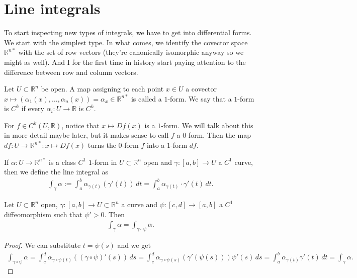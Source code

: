 \section{Line integrals}

To start inspecting new types of integrals, we have to get into differential forms. We start with the simplest type. In what comes, we identify the covector space $\mathbb{R}^{n*}$ with the set of row vectors (they're canonically isomorphic anyway so we might as well). And I for the first time in history start paying attention to the difference between row and column vectors.

\begin{definition}[$1$-forms]\label{def:1-forms}
	Let $U \subset \mathbb{R}^{n}$ be open. A map assigning to each point $x \in U$ a covector $x \mapsto (\alpha_{1}(x), \dots, \alpha_{n}(x)) = \alpha_{x} \in \mathbb{R}^{n*}$ is called a $1$-form. We say that a $1$-form is $C^{k}$ if every $\alpha_{i}: U \to \mathbb{R}$ is $C^{k}.$
\end{definition}
\newpage
\begin{eg}
	For $f \in C^{k}(U, \mathbb{R})$, notice that $x \mapsto Df(x)$ is a $1$-form. We will talk about this in more detail maybe later, but it makes sense to call $f$ a $0$-form. Then the map $df: U \to \mathbb{R}^{n*}: x \mapsto Df(x)$ turns the $0$-form $f$ into a $1$-form $df$.
\end{eg}

\begin{definition}\label{def:line-int}
	If $\alpha: U \to \mathbb{R}^{n*}$ is a class $C^{1}$ $1$-form in $U \subset \mathbb{R}^{n}$ open and $\gamma : [a,b] \to U$ a $C^{1}$ curve, then we define the line integral as
	\begin{align*}
		\int_{\gamma } \alpha := \int_{a}^{b} \alpha_{\gamma (t)}(\gamma '(t)) \, dt = \int_{a}^{b} \alpha_{\gamma (t)} \cdot \gamma '(t) \, dt.
	\end{align*}
\end{definition}

\begin{lemma}\label{lem:inv-pos-rep}
	Let $U \subset \mathbb{R}^{n}$ open, $\gamma: [a,b] \to U \subset \mathbb{R}^{n}$ a curve and $\psi: [c,d] \to [a,b]$ a $C^{1}$ diffeomorphism such that $\psi' > 0$. Then
	\begin{align*}
		\int_{\gamma } \alpha = \int_{\gamma \circ \psi} \alpha .
	\end{align*}
\end{lemma}
\begin{proof}
	We can substitute $t = \psi(s)$ and we get
	\begin{align*}
		\int_{\gamma \circ \psi} \alpha = \int_{c}^{d} \alpha_{\gamma \circ \psi(t)} ((\gamma \circ \psi)'(s)) \, ds = \int_{c}^{d} \alpha_{\gamma \circ \psi(s)}(\gamma '(\psi(s))) \psi'(s) \, ds = \int_{a}^{b} \alpha_{\gamma (t)} \gamma '(t) \, dt = \int_{\gamma } \alpha.
	\end{align*}
\end{proof}

